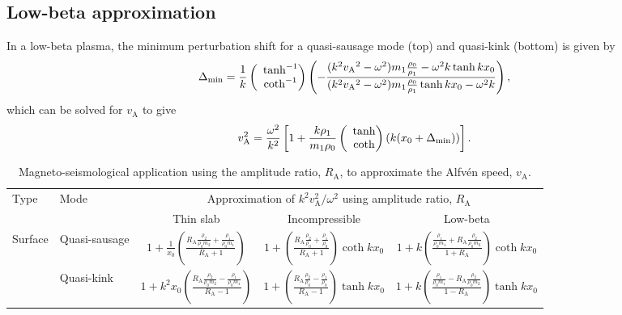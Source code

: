 \documentclass[namedreferences]{solarphysics}
\numberwithin{equation}{section}
\begin{document}
\begin{article}
\subsection{Low-beta approximation}
In a low-beta plasma, the minimum perturbation shift for a quasi-sausage mode (top) and quasi-kink (bottom) is given by
\begin{equation}
\Delta_\textrm{min} = \frac{1}{k}\left(\hspace{-0.07in}\begin{matrix} &\tanh^{-1} \\ &\coth^{-1} \end{matrix}\right)\left(-\frac{(k^2{v_\textrm{A}}^2-\omega^2)m_1\frac{\rho_0}{\rho_1} - \omega^2k\tanh{kx_0}}{(k^2{v_\textrm{A}}^2-\omega^2)m_1\frac{\rho_0}{\rho_1}\tanh{kx_0} - \omega^2k}\right),
\end{equation}
which can be solved for $v_\textrm{A}$ to give
\begin{equation}
v_\textrm{A}^2 = \frac{\omega^2}{k^2}\left[1 + \frac{k\rho_1}{m_1\rho_0}\left(\hspace{-0.07in}\begin{matrix} &\tanh \\ &\coth \end{matrix}\right)(k(x_0 + \Delta_\textrm{min}))\right].
\end{equation}

\begin{landscape}

\begin{table}
\caption{Magneto-seismological application using the amplitude ratio, $R_\textrm{A}$, to approximate the Alfv\'{e}n speed, $v_\textrm{A}$.}
\begin{tabular}{llccc}
  \toprule
Type & Mode & \multicolumn{3}{c}{Approximation of $k^2v_\textrm{A}^2 / \omega^2$ using amplitude ratio, $R_\textrm{A}$} \\
\cmidrule(lr){3-5}
	 &	    & \multicolumn{1}{c}{Thin slab} & \multicolumn{1}{c}{Incompressible} & \multicolumn{1}{c}{Low-beta} \\
  \midrule
\multirow{2}{*}{Surface} & Quasi-sausage & $ 1 + \frac{1}{x_0}\left(\frac{R_\textrm{A}\frac{\rho_2}{\rho_0m_2} + \frac{\rho_1}{\rho_0m_1}}{R_\textrm{A} + 1}\right) $ & $ 1 + \left( \frac{R_\textrm{A} \frac{\rho_2}{\rho_0} + \frac{\rho_1}{\rho_0}}{R_\textrm{A} + 1} \right) \coth{kx_0} $ & $ 1 + k \left( \frac{ \frac{\rho_1}{\rho_0m_1} + R_\textrm{A}\frac{\rho_2}{\rho_0m_2}}{1 + R_\textrm{A}} \right) \coth{kx_0} $ \\
						   & Quasi-kink	   & $ 1 + k^2x_0\left(\frac{R_\textrm{A}\frac{\rho_2}{\rho_0m_2} - \frac{\rho_1}{\rho_0m_1}}{R_\textrm{A} - 1}\right) $ & $ 1 + \left( \frac{R_\textrm{A} \frac{\rho_2}{\rho_0} - \frac{\rho_1}{\rho_0}}{R_\textrm{A} - 1} \right) \tanh{kx_0} $ & $ 1 + k \left( \frac{ \frac{\rho_1}{\rho_0m_1} - R_\textrm{A}\frac{\rho_2}{\rho_0m_2}}{1 - R_\textrm{A}} \right) \tanh{kx_0} $ \\
  \bottomrule
\end{tabular} \label{table: amp ratio}
\end{table}



\end{landscape}
\end{article}
\end{document}
